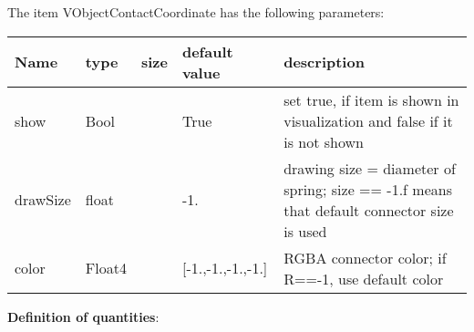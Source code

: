 The item VObjectContactCoordinate has the following parameters:\vspace{-1cm}\\ 
\begin{center}
  \footnotesize
  \begin{longtable}{| p{4.5cm} | p{2.5cm} | p{0.5cm} | p{2.5cm} | p{6cm} |}
    \hline
    \bf Name & \bf type & \bf size & \bf default value & \bf description \\ \hline
    show &     Bool &      &     True &     set true, if item is shown in visualization and false if it is not shown\\ \hline
    drawSize &     float &      &     -1. &     drawing size = diameter of spring; size == -1.f means that default connector size is used\\ \hline
    color &     Float4 &      &     [-1.,-1.,-1.,-1.] &     RGBA connector color; if R==-1, use default color\\ \hline
	  \end{longtable}
	\end{center}
{\bf Definition of quantities}:\\
\newpage


